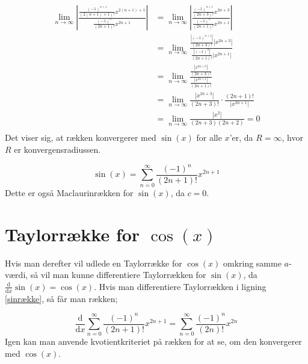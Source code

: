 \begin{align*}
\lim\limits_{n \to \infty}
\left\lvert
\frac{\frac{(-1)^{n+1}}{(2(n+1)+1)!}x^{2(n+1)+1}}
{\frac{(-1)^n}{(2n+1)!}x^{2n+1}} 
\right\lvert
&=
\lim\limits_{n \to \infty}
\left\lvert
\frac{\frac{(-1)^{n+1}}{(2n+3)!}x^{2n+3}}
{\frac{(-1)^n}{(2n+1)!}x^{2n+1}}
\right\lvert 
\\
&=
\lim\limits_{n \to \infty}
\frac{\frac{\left\lvert (-1)^{n+1} \right\lvert }{(2n+3)!} \left\lvert x^{2n+3} \right\lvert }
{\frac{\left\lvert (-1)^n \right\lvert }{(2n+1)!} \left\lvert x^{2n+1} \right\lvert }
\\
&=
\lim\limits_{n \to \infty}
\frac{\frac{\left\lvert x^{2n+3} \right\lvert}{(2n+3)!}}
{\frac{\left\lvert x^{2n+1} \right\lvert}{(2n+1)!} }
\\
&=
\lim\limits_{n \to \infty}
\frac{\left\lvert x^{2n+3} \right\lvert}{(2n+3)!}
\cdot
\frac{(2n+1)!}{\left\lvert x^{2n+1} \right\lvert}
\\
&=
\lim\limits_{n \to \infty}
\frac{\left\lvert x^{2} \right\lvert}{(2n+3)(2n+2)}
=0 \\
\end{align*}
Det viser sig, at rækken konvergerer med $\sin(x)$ for alle $x$'er, da $R=\infty$, hvor $R$ er konvergensradiussen.

\begin{equation}\label{sinrække}
\sin(x)=\sum_{n=0}^{\infty} \frac{(-1)^n}{(2n+1)!}x^{2n+1}
\end{equation}
Dette er også Maclaurinrækken for $\sin(x)$, da $c=0$.


\section{Taylorrække for $\cos(x)$}

Hvis man derefter vil udlede en Taylorrække for $\cos(x)$ omkring samme $a$-værdi, så vil man kunne differentiere Taylorrækken for $\sin(x)$, da $\frac{\mathrm{d}}{\mathrm{d}x}\sin(x)=\cos(x)$. Hvis man differentiere Taylorrækken i ligning \ref{sinrække}, så får man rækken;


\[
\frac{\mathrm{d}}{\mathrm{d}x} \sum_{n=0}^{\infty} \frac{(-1)^n}{(2n+1)!}x^{2n+1}
=
\sum_{n=0}^{\infty} \frac{(-1)^n}{(2n)!}x^{2n}
\]
Igen kan man anvende kvotientkriteriet på rækken for at se, om den konvergerer med $\cos(x)$.

